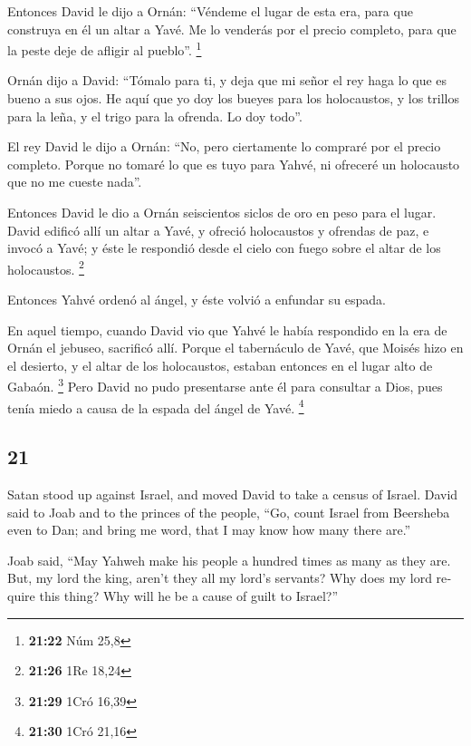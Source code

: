 \begin{paracol}{2}
 Entonces David le dijo a Ornán: ``Véndeme el lugar de
esta era, para que construya en él un altar a Yavé. Me lo venderás por
el precio completo, para que la peste deje de afligir al pueblo''.
\footnote{\textbf{21:22} Núm 25,8}

 Ornán dijo a David: ``Tómalo para ti, y deja que mi
señor el rey haga lo que es bueno a sus ojos. He aquí que yo doy los
bueyes para los holocaustos, y los trillos para la leña, y el trigo para
la ofrenda. Lo doy todo''.

 El rey David le dijo a Ornán: ``No, pero ciertamente lo
compraré por el precio completo. Porque no tomaré lo que es tuyo para
Yahvé, ni ofreceré un holocausto que no me cueste nada''.

 Entonces David le dio a Ornán seiscientos siclos de oro
en peso para el lugar.  David edificó allí un altar a
Yavé, y ofreció holocaustos y ofrendas de paz, e invocó a Yavé; y éste
le respondió desde el cielo con fuego sobre el altar de los holocaustos.
\footnote{\textbf{21:26} 1Re 18,24}

 Entonces Yahvé ordenó al ángel, y éste volvió a enfundar
su espada.

 En aquel tiempo, cuando David vio que Yahvé le había
respondido en la era de Ornán el jebuseo, sacrificó allí.
 Porque el tabernáculo de Yavé, que Moisés hizo en el
desierto, y el altar de los holocaustos, estaban entonces en el lugar
alto de Gabaón. \footnote{\textbf{21:29} 1Cró 16,39} 
Pero David no pudo presentarse ante él para consultar a Dios, pues tenía
miedo a causa de la espada del ángel de Yavé. \footnote{\textbf{21:30}
  1Cró 21,16}

\switchcolumn
\begin{otherlanguage}{english}

\hypertarget{section-41}{%
\section{21}\label{section-41}}

 Satan stood up against Israel, and moved David to take a
census of Israel.  David said to Joab and to the princes
of the people, ``Go, count Israel from Beersheba even to Dan; and bring
me word, that I may know how many there are.''

 Joab said, ``May Yahweh make his people a hundred times
as many as they are. But, my lord the king, aren't they all my lord's
servants? Why does my lord require this thing? Why will he be a cause of
guilt to Israel?''


\end{otherlanguage}
\end{paracol}

